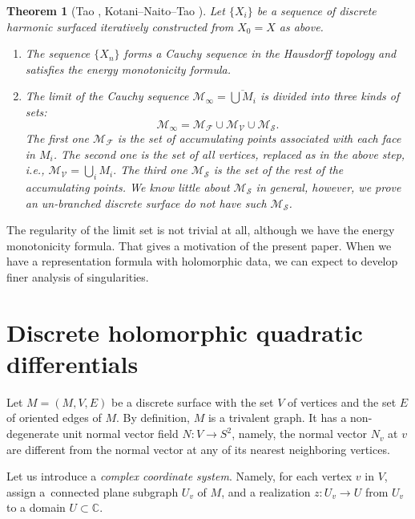 \documentclass[pdftex]{sigma}
\newcommand{\C}{\mathbb{C}}
\newcommand{\MV}{{\mathcal V}}
\newcommand{\MF}{{\mathcal F}}
\newcommand{\MM}{{\mathcal M}}
\newcommand{\MS}{{\mathcal S}}
\newcommand{\1}{{\bf 1}}
\numberwithin{equation}{section}
\newtheorem{Theorem}{Theorem}[section]
\begin{document}
\begin{Theorem}[Tao \cite{tao}, Kotani--Naito--Tao \cite{kotani-naito-tao}]
 Let $\{X_{i} \}$ be a sequence of discrete harmonic surfaced iteratively constructed from $X_{0} = X$ as above.
 \begin{enumerate}\itemsep=0pt
 \item[$(1)$]
 The sequence $\{ X_n \}$ forms a Cauchy sequence in the Hausdorff topology
 and satisfies the energy monotonicity formula. %
 \item[$(2)$]
 The limit of the Cauchy sequence
 $\mathcal {M}_{\infty} = \overline{\bigcup M_i}$
 is divided into three kinds of sets:
 \begin{equation*}
 \mathcal {M}_{\infty} = \MM_{\MF} \cup \MM_{\MV} \cup \MM_{\MS}.
 \end{equation*}
 The first one $\MM_{\MF}$ is the set of accumulating points associated with each face in $M_i$.
 The second one is the set of all vertices, replaced as in the above step,
 i.e., \begin{math}
 \mathcal{M}_{\MV} = \bigcup_{i} M_i.
 \end{math}
 The third one $\MM_{\MS}$ is the set of the rest of the accumulating points.
 We know little about $\MM_{\MS}$ in general,
 however, we prove an un-branched discrete surface do not have such $\MM_{\MS}$.
 \end{enumerate}
\end{Theorem}
The regularity of the limit set is not trivial at all,
although we have the energy monotonicity formula.
That gives a motivation of the present paper.
When we have a representation formula with holomorphic data, we can expect to develop finer analysis of singularities.
\section{Discrete holomorphic quadratic differentials}
Let $M=(M, V, E)$ be a discrete surface with the set $V$ of vertices and the set $E$ of oriented edges of $M$.
By definition, $M$ is a trivalent graph. It has a non-degenerate unit normal vector field $N\colon V \to S^2$,
namely, the normal vector $N_v$ at $v$ are different from the normal vector at any of its nearest neighboring vertices.

Let us introduce a {\it complex coordinate system}.
Namely, for each vertex $v$ in $V$, assign a~connected plane subgraph $U_v$ of $M$,
and a realization $z\colon U_v \to U$ from $U_v$ to a domain $U \subset \C$.
\end{document}
